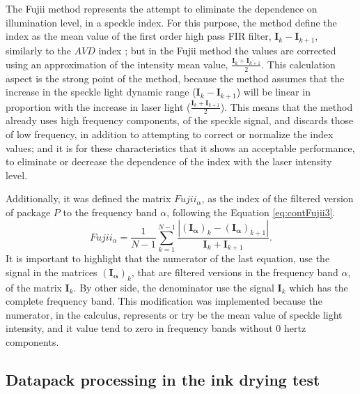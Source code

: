 \documentclass[review]{elsarticle}
\begin{document}
The Fujii method represents the attempt to eliminate 
the dependence on illumination level, in a speckle index.
For this purpose, the method define the index as the mean value of the  first order high pass FIR filter, 
$\mathbf{I}_{k}-\mathbf{I}_{k+1}$, similarly to the  $AVD$ index \cite{avd};
but in the Fujii method the values are corrected using an approximation of the intensity mean value, 
$\frac{\mathbf{I}_{k}+\mathbf{I}_{k+1}}{2}$.
This calculation aspect is the strong point of the method,
because the method assumes that the increase in the speckle 
light dynamic range ($\mathbf{I}_{k}-\mathbf{I}_{k+1}$) 
will be linear in proportion with the increase in laser light ($\frac{\mathbf{I}_{k}+\mathbf{I}_{k+1}}{2}$).
This means that the method already uses high frequency components, 
of the speckle signal, 
and discards those of low frequency, 
in addition to attempting to correct or  normalize the index values;
and it is for these characteristics that it shows an acceptable performance,
to eliminate or decrease the dependence of the index with the laser intensity level.

Additionally, it was defined the matrix $Fujii_{\alpha}$, 
as the index of the filtered version of package $P$ to the frequency band $\alpha$, following the Equation \ref{eq:contFujii3}.
\begin{equation}\label{eq:contFujii3}
Fujii_{\alpha}  = \frac{1}{N-1} \sum_{k=1}^{N-1} \frac{|\mathbf{(I_{\alpha})}_{k}-\mathbf{(I_{\alpha})}_{k+1}|}{\mathbf{I}_{k}+\mathbf{I}_{k+1}}.
\end{equation}
It is important to highlight that the numerator of the last equation, 
use the signal in the matrices $\mathbf{(I_{\alpha})}_{k}$, that are filtered versions in the frequency band $\alpha$,
of the matrix $\mathbf{I}_{k}$. 
By other side, the denominator use the signal $\mathbf{I}_{k}$ which has the complete frequency band.
This modification was implemented because the numerator, in the calculus, 
represents or try be the mean value of speckle light intensity, 
and it value tend to zero in frequency bands without 0 hertz components.


\subsection{Datapack processing in the ink drying test}
\label{subsec:numprocink}
\end{document}
